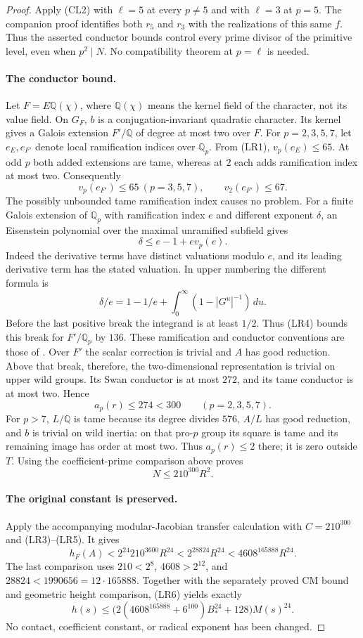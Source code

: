 \begin{proof}
Apply (CL2) with $\ell=5$ at every $p\ne5$ and with $\ell=3$ at
$p=5$. The companion proof identifies both $r_5$ and $r_3$ with
the realizations of this same $f$. Thus the asserted conductor
bounds control every prime divisor of the primitive level, even
when $p^2\mid N$. No compatibility theorem at $p=\ell$ is needed.

\paragraph{The conductor bound.}
Let $F=E\mathbb Q(\chi)$, where $\mathbb Q(\chi)$ means the kernel
field of the character, not its value field. On $G_F$, $b$ is a
conjugation-invariant quadratic character. Its kernel gives a Galois
extension $F'/\mathbb Q$ of degree at most two over $F$.
For $p=2,3,5,7$, let $e_E,e_{F'}$ denote local ramification indices
over $\mathbb Q_p$. From (LR1), $v_p(e_E)\le65$.
At odd $p$ both added extensions are tame, whereas at $2$ each
adds ramification index at most two. Consequently
\[
 v_p(e_{F'})\le65\ (p=3,5,7),\qquad v_2(e_{F'})\le67.
\tag{LR4}
\]
The possibly unbounded tame ramification index causes no problem.
For a finite Galois extension of $\mathbb Q_p$ with ramification
index $e$ and different exponent $\delta$, an Eisenstein polynomial
over the maximal unramified subfield gives
\[
 \delta\le e-1+ev_p(e).
\]
Indeed the derivative terms have distinct valuations modulo $e$,
and its leading derivative term has the stated valuation. In upper
numbering the different formula is
\[
 \delta/e=1-1/e+\int_0^\infty(1-|G^u|^{-1})\,du.
\]
Before the last positive break the integrand is at least $1/2$.
Thus (LR4) bounds this break for $F'/\mathbb Q_p$ by $136$.
These ramification and conductor conventions are those of
\cite[\S\S4.1--4.3, pp.~155--159]{serrelocal}.
Over $F'$ the scalar correction is trivial and $A$ has good reduction.
Above that break, therefore, the two-dimensional representation is
trivial on upper wild groups. Its Swan conductor is at most $272$,
and its tame conductor is at most two. Hence
\[
 a_p(r)\le274<300\qquad(p=2,3,5,7).
\]
For $p>7$, $L/\mathbb Q$ is tame because its degree divides $576$,
$A/L$ has good reduction, and $b$ is trivial on wild inertia:
on that pro-$p$ group its square is tame and its remaining image has
order at most two. Thus $a_p(r)\le2$ there; it is zero outside $T$.
Using the coefficient-prime comparison above proves
\[
 N\le210^{300}R^2.
\tag{LR5}
\]

\paragraph{The original constant is preserved.}
Apply the accompanying modular-Jacobian transfer calculation with
$C=210^{300}$ and (LR3)--(LR5). It gives
\[
 h_F(A)<2^{24}210^{3600}R^{24}
 <2^{28824}R^{24}<4608^{165888}R^{24}.
\tag{LR6}
\]
The last comparison uses $210<2^8$, $4608>2^{12}$, and
$28824<1990656=12\cdot165888$. Together with the separately proved
CM bound and geometric height comparison, (LR6) yields exactly
\[
 h(s)\le
 \bigl(2(4608^{165888}+6^{100})B_*^{24}+128\bigr)M(s)^{24}.
\]
No contact, coefficient constant, or radical exponent has been changed.


\end{proof}
